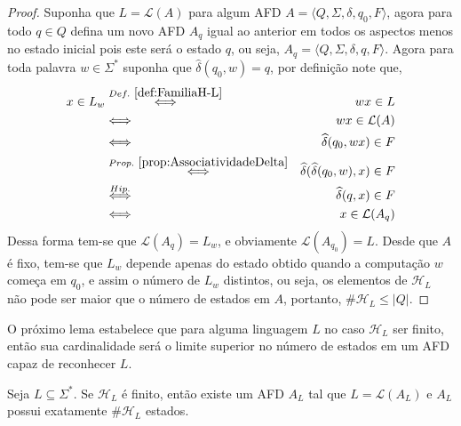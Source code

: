 \begin{proof}
	Suponha que $L = \mathcal{L}(A)$ para algum AFD $A = \langle Q, \Sigma, \delta, q_0, F\rangle$, agora para todo $q \in Q$ defina um novo AFD $A_q$ igual ao anterior em todos os aspectos menos no estado inicial pois este será o estado $q$, ou seja,  $A_q = \langle Q, \Sigma, \delta, q, F\rangle$. Agora para toda palavra $w \in \Sigma^*$ suponha que $\widehat{\delta}(q_0, w) = q$, por definição note que, 
	\begin{eqnarray*}
		x \in L_w & \stackrel{Def. \ \ref{def:FamiliaH-L}}{\Longleftrightarrow} & wx \in L\\
		& \Longleftrightarrow & wx \in \mathcal{L}(A)\\
		& \Longleftrightarrow & \widehat{\delta}(q_0, wx) \in F\\
		& \stackrel{Prop. \ \ref{prop:AssociatividadeDelta}}{\Longleftrightarrow} & \widehat{\delta}(\widehat{\delta}(q_0, w), x) \in F\\
		& \stackrel{Hip.}{\Longleftrightarrow} & \widehat{\delta}(q, x) \in F\\
		& \Longleftrightarrow & x \in \mathcal{L}(A_q)
	\end{eqnarray*}
	Dessa forma tem-se que $\mathcal{L}(A_q) = L_w$, e obviamente $\mathcal{L}(A_{q_0}) = L$. Desde que  $A$ é fixo, tem-se que $L_w$ depende apenas do estado obtido quando a computação $w$ começa em $q_0$, e assim o número de $L_w$ distintos, ou seja, os elementos de $\mathcal{H}_L$ não pode ser maior que o número de estados em $A$, portanto, $\#\mathcal{H}_L \leq |Q|$.
\end{proof}

O próximo lema estabelece que para alguma linguagem $L$ no caso $\mathcal{H}_L$ ser finito, então sua cardinalidade será o limite superior no número de estados em um AFD capaz de reconhecer $L$.

\begin{lemma}\label{lema:LimiteSuperiorEstados}
	Seja $L \subseteq \Sigma^*$. Se $\mathcal{H}_L$ é finito, então existe um AFD $A _L$ tal que $L = \mathcal{L}(A_L)$ e $A_L$ possui exatamente $\#\mathcal{H}_L$ estados.
\end{lemma}


